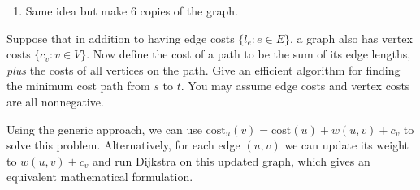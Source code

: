 \begin{solution}
\begin{enumerate}
      \begin{equation}
        u_\text{even} \to v_\text{odd} \to w_\text{even} \to u_{\text{odd}} \to t_\text{even} \qquad \text{corresponds to}\qquad u\to v\to w \to u\to t.
      \end{equation}

      Combining both observations above, there exists an $s-t$ walk in $G$ with an even number of edges if and only if there is a path in $G'$ from $s_\text{even}$ to $t_\text{even}$. The rest is simple: run a pathfinding algorithm on $G'$. The weights are non-negative, so we use Dijkstra's algorithm. 

      Total runtime? Time to construct $G'$ involves $\lvert V'\rvert = 2\lvert V\lvert$ vertices and $\lvert E'\rvert = 2\lvert E\rvert$ edges. This is dominated by running Dijkstra on $G'$, which takes $O((|V'| +\lvert E'\rvert )\log \lvert V'\rvert) = O((|V|+\lvert E\rvert)\log \lvert V\rvert)$ time. Finally, transforming the path in $G'$ back to a walk in $G$ takes linear time w.r.t. the path length (one step for each edge), which is bounded by $O(\lvert E'\rvert)$.  So overall most work is dominated by Dijkstra's algorithm and the overall algorithm runs in $O((|V|+\lvert E\rvert) \log \lvert V\rvert)$.

      \item Same idea but make 6 copies of the graph. 
    \end{enumerate}
  \end{solution}

  \begin{exercise}
    Suppose that in addition to having edge costs $\{l_e:e\in E\}$, a graph also has vertex costs $\{c_v:v\in V\}$. Now define the cost of a path to be the sum of its edge lengths, \textit{plus} the costs of all vertices on the path. Give an efficient algorithm for finding the minimum cost path from $s$ to $t$. You may assume edge costs and vertex costs are all nonnegative.
  \end{exercise}
  \begin{solution}
    Using the generic approach, we can use $\text{cost}_u(v)=\text{cost}(u)+w(u,v)+c_v$ to solve this problem. Alternatively, for each edge $(u,v)$ we can update its weight to $w(u,v)+c_v$ and run Dijkstra on this updated graph, which gives an equivalent mathematical formulation.
  \end{solution}


